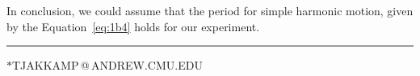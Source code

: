 In conclusion, we could assume that the period for simple harmonic motion, given by the Equation~\eqref{eq:1b4} holds for our experiment. 




%   
%   

\onecolumngrid
\vspace{1cm}
\hrule
\vspace{0.5cm}
\vfill
{\hfill\noindent\rm\small $*$TJAKKAMP\,@\,ANDREW.CMU.EDU\hfill}

